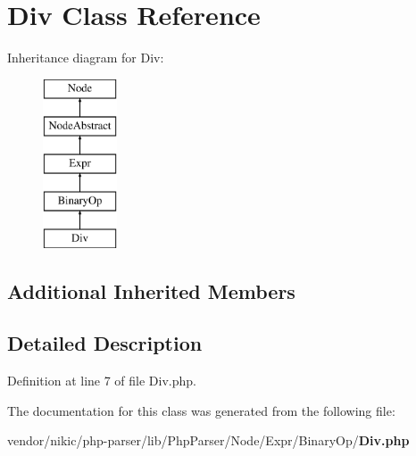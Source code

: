 \section{Div Class Reference}
\label{class_php_parser_1_1_node_1_1_expr_1_1_binary_op_1_1_div}
Inheritance diagram for Div\+:\begin{figure}[H]
\begin{center}
\leavevmode
\includegraphics[height=5.000000cm]{class_php_parser_1_1_node_1_1_expr_1_1_binary_op_1_1_div}
\end{center}
\end{figure}
\subsection*{Additional Inherited Members}


\subsection{Detailed Description}


Definition at line 7 of file Div.\+php.



The documentation for this class was generated from the following file\+:\begin{DoxyCompactItemize}
\item 
vendor/nikic/php-\/parser/lib/\+Php\+Parser/\+Node/\+Expr/\+Binary\+Op/{\bf Div.\+php}\end{DoxyCompactItemize}

